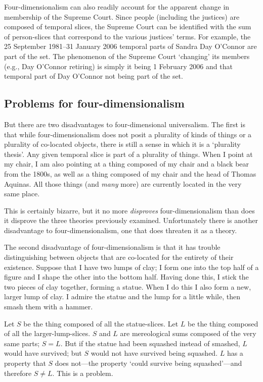 \documentclass[11pt]{article}
\begin{document}
\begin{spacing}{1.5}
Four-dimensionalism can also readily account for the apparent change
in membership of the Supreme Court.  Since people (including the
justices) are composed of temporal slices, the Supreme Court can be
identified with the sum of person-slices that correspond to the
various justices' terms.  For example, the 25 September 1981--31
January 2006 temporal parts of Sandra Day O'Connor are part of the
set.  The phenomenon of the Supreme Court `changing' its members
(e.g., Day O'Connor retiring) is simply it being 1 February 2006 and
that temporal part of Day O'Connor not being part of the set.

\subsection{Problems for four-dimensionalism}
\label{4dp}
But there are two disadvantages to four-dimensional universalism.  The
first is that while four-dimensionalism does not posit a plurality of
kinds of things or a plurality of co-located objects, there is still a
sense in which it is a `plurality thesis'.  Any given temporal slice
is part of a plurality of things.  When I point at my chair, I am also
pointing at a thing composed of my chair and a black bear from the
1800s, as well as a thing composed of my chair and the head of Thomas
Aquinas.  All those things (and {\em many} more) are currently located
in the very same place.

This is certainly bizarre, but it no more {\em disproves}
four-dimensionalism than does it disprove the three theories
previously examined.  Unfortunately there is another disadvantage to
four-dimensionalism, one that does threaten it as a theory.

The second disadvantage of four-dimensionalism is that it has trouble
distinguishing between objects that are co-located for the entirety of
their existence.  Suppose that I have two lumps of clay; I form one
into the top half of a figure and I shape the other into the bottom
half.  Having done this, I stick the two pieces of clay together,
forming a statue.  When I do this I also form a new, larger lump of
clay.  I admire the statue and the lump for a little while, then smash
them with a hammer.

Let $S$ be the thing composed of all the statue-slices.  Let $L$ be
the thing composed of all the larger-lump-slices.  $S$ and $L$ are
mereological sums composed of the very same parts; $S = L$.  But if
the statue had been squashed instead of smashed, $L$ would have
survived; but $S$ would not have survived being squashed.  $L$ has a
property that $S$ does not---the property `could survive being
squashed'---and therefore $S \neq L$.  This is a problem.


\end{spacing}
\end{document}

